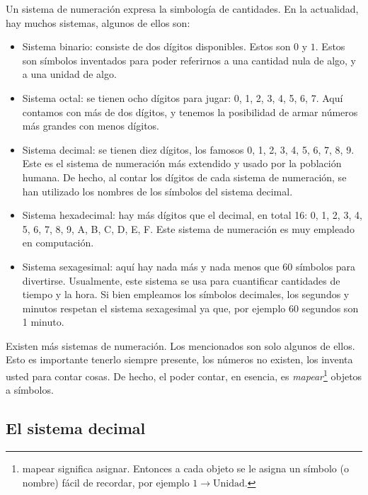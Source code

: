 Un sistema de numeración expresa la simbología de cantidades. En la actualidad, hay muchos sistemas, algunos de ellos son:
\begin{itemize}
  \item Sistema binario: consiste de dos dígitos disponibles. Estos son \(0\) y \(1\). Estos son símbolos inventados para poder referirnos a una cantidad nula de algo, y a una unidad de algo.
  \item Sistema octal: se tienen ocho dígitos para jugar: 0, 1, 2, 3, 4, 5, 6, 7. Aquí contamos con más de dos dígitos, y tenemos la posibilidad de armar números más grandes con menos dígitos.
  \item Sistema decimal: se tienen diez dígitos, los famosos 0, 1, 2, 3, 4, 5, 6, 7, 8, 9. Este es el sistema de numeración más extendido y usado por la población humana. De hecho, al contar los dígitos de cada sistema de numeración, se han utilizado los nombres de los símbolos del sistema decimal.
  \item Sistema hexadecimal: hay más dígitos que el decimal, en total 16: 0, 1, 2, 3, 4, 5, 6, 7, 8, 9, A, B, C, D, E, F. Este sistema de numeración es muy empleado en computación.
  \item Sistema sexagesimal: aquí hay nada más y nada menos que 60 símbolos para divertirse. Usualmente, este sistema se usa para cuantificar cantidades de tiempo y la hora. Si bien empleamos los símbolos decimales, los segundos y minutos respetan el sistema sexagesimal ya que, por ejemplo 60 segundos son 1 minuto.
\end{itemize}

Existen más sistemas de numeración. Los mencionados son solo algunos de ellos. Esto es importante tenerlo siempre presente, los números no existen, los inventa usted para contar cosas. De hecho, el poder contar, en esencia, es \emph{mapear}\footnote{mapear significa asignar. Entonces a cada objeto se le asigna un símbolo (o nombre) fácil de recordar, por ejemplo \(1\to\text{Unidad}\).} objetos a símbolos.

\subsection{El sistema decimal}

